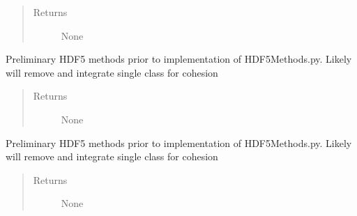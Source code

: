 \documentclass[letterpaper,10pt,english]{sphinxmanual}
\begin{document}
\begin{fulllineitems}
\begin{fulllineitems}
\begin{quote}
\begin{description}
\item[{Returns}] \leavevmode
\sphinxAtStartPar
None

\end{description}\end{quote}

\end{fulllineitems}


\begin{fulllineitems}
\label{\detokenize{index:droogCNC.TwoAxisStage.__setMetadata}}
\sphinxAtStartPar
Preliminary HDF5 methods prior to implementation of HDF5Methods.py. Likely will remove and integrate single
class for cohesion
\begin{quote}\begin{description}
\item[{Returns}] \leavevmode
\sphinxAtStartPar
None

\end{description}\end{quote}

\end{fulllineitems}


\begin{fulllineitems}
\label{\detokenize{index:droogCNC.TwoAxisStage.__setMetadataFromFile}}
\sphinxAtStartPar
Preliminary HDF5 methods prior to implementation of HDF5Methods.py. Likely will remove and integrate single
class for cohesion
\begin{quote}\begin{description}
\item[{Returns}] \leavevmode
\sphinxAtStartPar
None

\end{description}\end{quote}


\end{fulllineitems}
\end{fulllineitems}
\end{document}

